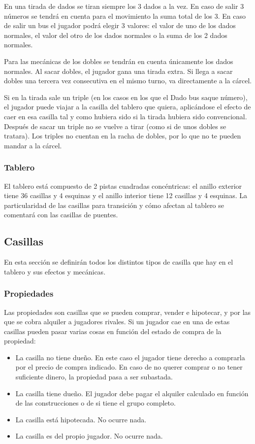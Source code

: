 En una tirada de dados se tiran siempre los 3 dados a la vez.
En caso de salir 3 números se tendrá en cuenta para el movimiento
la suma total de los 3. En caso de salir un bus el jugador podrá elegir 3
valores: el valor de uno de los dados normales, el valor del otro de los dados
normales o la suma de los 2 dados normales.

Para las mecánicas de los dobles se tendrán en cuenta únicamente los dados 
normales. Al sacar dobles, el jugador gana una tirada extra. Si llega a 
sacar dobles una tercera vez consecutiva en el mismo turno, va directamente 
a la cárcel. 

Si en la tirada sale un triple (en los casos en los que el Dado bus saque número),
el jugador puede viajar a la casilla del tablero que quiera, aplicándose el efecto
de caer en esa casilla tal y como hubiera sido si la tirada hubiera sido 
convencional. Después de sacar un triple no se vuelve a tirar (como si de unos 
dobles se tratara). Los triples no cuentan en la racha de dobles, por lo que no 
te pueden mandar a la cárcel.

\subsubsection{Tablero}
El tablero está compuesto de 2 pistas cuadradas concéntricas:
el anillo exterior tiene 36 casillas y 4 esquinas y el anillo 
interior tiene 12 casillas y 4 esquinas. La particularidad
de las casillas para transición y cómo afectan al tablero 
se comentará con las casillas de puentes.


\subsection{Casillas}
En esta sección se definirán todos los distintos tipos de casilla 
que hay en el tablero y sus efectos y mecánicas.

\subsubsection{Propiedades}
Las propiedades son casillas que se pueden comprar, vender e hipotecar,
y por las que se cobra alquiler a jugadores rivales. Si un jugador 
cae en una de estas casillas pueden pasar varias cosas en función del 
estado de compra de la propiedad:
\begin{itemize}
	\item La casilla no tiene dueño. En este caso el jugador tiene derecho 
	a comprarla por el precio de compra indicado. En caso de no querer comprar o no 
	tener suficiente dinero, la propiedad pasa a ser subastada.
	\item La casilla tiene dueño. El jugador debe pagar el alquiler calculado
	en función de las construcciones o de si tiene el grupo completo.
	\item La casilla está hipotecada. No ocurre nada.
	\item La casilla es del propio jugador. No ocurre nada.
\end{itemize}

